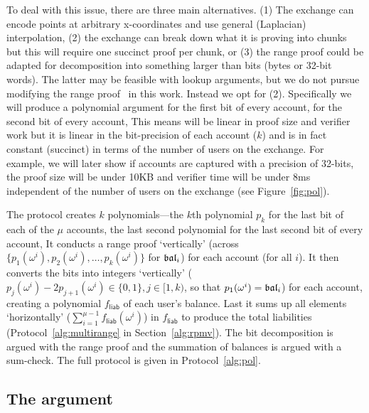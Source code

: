 To deal with this issue, there are three main alternatives. (1) The exchange can encode points at arbitrary x-coordinates and use general (Laplacian) interpolation, (2) the exchange can break down what it is proving into chunks but this will require one succinct proof per chunk, or (3) the range proof could be adapted for decomposition into something larger than bits (\eg bytes or 32-bit words). The latter may be feasible with lookup arguments, but we do not pursue modifying the range proof~\cite{rangeproof} in this work. Instead we opt for (2). Specifically we will produce a polynomial argument for the first bit of every account, for the second bit of every account, \etc This means \pol will be linear in proof size and verifier work but it is linear in the bit-precision of each account ($k$) and is in fact constant (succinct) in terms of the number of users on the exchange. For example, we will later show if accounts are captured with a precision of 32-bits, the proof size will be under 10KB and verifier time will be under 8ms independent of the number of users on the exchange (see Figure~\ref{fig:pol}).  



The protocol creates $k$ polynomials---the $k$th polynomial $p_k$ for the last bit of each of the $\mu$ accounts, the last second polynomial for the last second bit of every account, \etc It conducts a range proof `vertically' (across $\{p_1(\omega^i), p_2(\omega^i), \ldots, p_k(\omega^i)\}$ for $\mathfrak{bal}_i$) for each account (for all $i$). It then converts the bits into integers `vertically' ($p_j(\omega^i)-2p_{j+1}(\omega^i)\in\{0,1\},j\in[1,k)$, so that $p_1(\omega^i)=\mathfrak{bal}_i$)  for each account, creating a polynomial $f_\mathsf{liab}$ of each user's balance. Last it sums up all elements `horizontally' ($\sum_{i=1}^{\mu-1} f_\mathsf{liab}(\omega^i)$) in $f_\mathsf{liab}$ to produce the total liabilities (Protocol~\ref{alg:multirange} in Section~\ref{alg:rpmv}). The bit decomposition is argued with the range proof and the summation of balances is argued with a sum-check. The full protocol is given in Protocol~\ref{alg:pol}.


\subsection{The \userproof argument}



